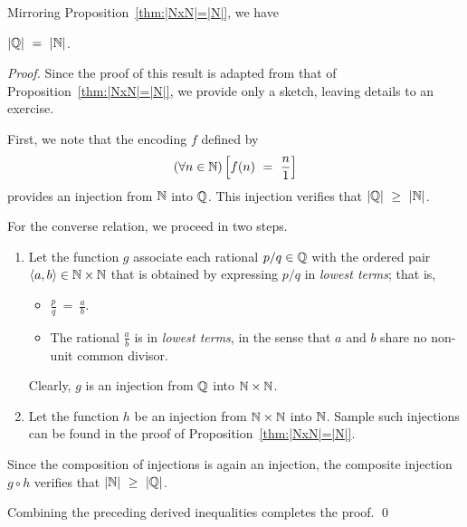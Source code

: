 \smallskip

\hspace*{.35in}{\em the set $\N$ has the same cardinality as the set $\Q$.}

\smallskip

\noindent
Mirroring Proposition~\ref{thm:|NxN|=|N|}, we have

\begin{prop}
\label{thm:|Q|=|N|}
$|\mathbb{Q}| \ = \ |\mathbb{N}|$.
\end{prop}

\begin{proof}
Since the proof of this result is adapted from that of Proposition~\ref{thm:|NxN|=|N|}, we provide only a sketch, leaving details to an exercise.

\smallskip

First, we note that the encoding $f$ defined by
\[ (\forall n \in \N) \left[ f(n) \ = \ \frac{n}{1} \right] \]
provides an injection from $\N$ into $\Q$.  This injection verifies that $|\mathbb{Q}| \ \geq \ |\mathbb{N}|$.

\smallskip

For the converse relation, we proceed in two steps.
\begin{enumerate}
\item
Let the function $g$ associate each rational $p/q \in \mathbb{Q}$ with the ordered pair $\langle a, b \rangle \in \mathbb{N} \times \mathbb{N}$ that is obtained by expressing $p/q$ in {\em lowest terms}; that is,
  \begin{itemize}
  \item
$\displaystyle \frac{p}{q} \ = \ \frac{a}{b}$.
  \medskip\item
The rational $\displaystyle \frac{a}{b}$ is in {\em lowest terms}, in the sense that $a$ and $b$ share no non-unit common divisor.
  \end{itemize}
Clearly, $g$ is an injection from $\Q$ into $\mathbb{N} \times \mathbb{N}$.

\medskip\item
Let the function $h$ be an injection from $\mathbb{N} \times \mathbb{N}$ into $\N$.  Sample such injections can be found in the proof of Proposition~\ref{thm:|NxN|=|N|}.
\end{enumerate}
Since the composition of injections is again an injection, the composite injection $g \circ h$ verifies that $|\mathbb{N}| \ \geq \ |\mathbb{Q}|$.

\smallskip

Combining the preceding derived inequalities completes the proof.
\qed
\end{proof}


